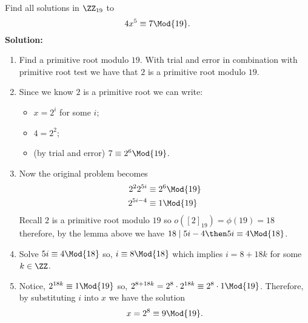 \documentclass[12pt, a4paper]{article}
\begin{document}
\begin{mdexample}
    Find all solutions in \(\ZZ_{19}\) to 
    \[4x^5 \equiv 7 \Mod{19}.\]
    \textbf{Solution:}
    \begin{enumerate}
        \item Find a primitive root modulo \(19\). With trial and error in combination with primitive root test we have that \(2\) is a primitive root modulo \(19\).
        \item Since we know \(2\) is a primitive root we can write:
        \begin{itemize}
            \item \(x =2^i\) for some \(i\);
            \item \(4=2^2\);
            \item (by trial and error) \(7 \equiv 2^6 \Mod{19}\).
        \end{itemize}
        \item Now the original problem becomes 
            \[\begin{aligned}
                2^2 2^{5i} &\equiv 2^6 \Mod{19} \\
                2^{5i-4} &\equiv 1 \Mod{19}
            \end{aligned}\]
            Recall \(2\) is a primitive root modulo \(19\) so \(o([2]_{19}) =\phi(19)=18\) therefore, by the lemma above we have \(18 \mid 5i-4 \then 5i \equiv 4 \Mod{18}\).
        \item Solve \(5i \equiv 4 \Mod{18}\) so, \(i \equiv 8 \Mod{18}\) which implies \(i=8+18k\) for some \(k\in \ZZ\).
        \item Notice, \(2^{18k} \equiv 1 \Mod{19}\) so, \(2^{8+18k}  = 2^8 \cdot 2^{18k} \equiv 2^8 \cdot 1 \Mod{19}\).
        Therefore, by substituting \(i\) into \(x\) we have the solution 
        \[x =2^8 \equiv 9 \Mod{19}.\]
    \end{enumerate}
\end{mdexample}
\end{document}
